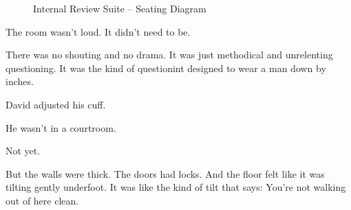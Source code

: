 \medskip

\begin{figure}[H]
  \centering
  \begin{adjustbox}{width=0.9\linewidth}
  \end{adjustbox}
  \caption{Internal Review Suite -- Seating Diagram}
\end{figure}

\medskip

The room wasn’t loud. It didn’t need to be.

There was no shouting and no drama. It was just methodical and unrelenting questioning. It was the kind 
of questionint designed to wear a man down by inches.

David adjusted his cuff.

He wasn’t in a courtroom.

Not yet.

But the walls were thick. The doors had locks. And the floor felt like it was tilting 
gently underfoot. It was like 
the kind of tilt that says: You’re not walking out of here clean.

\medskip

